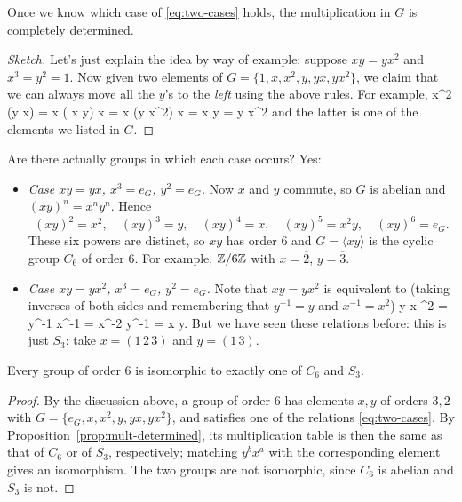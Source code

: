 \documentclass[reqno,11pt]{amsart}
\begin{document}
\begin{proposition}\label{prop:mult-determined}
Once we know which case of \eqref{eq:two-cases} holds, the multiplication
in $G$ is completely determined.
\end{proposition}
\begin{proof}[Sketch] Let's just explain the idea by way of example: suppose $xy=yx^2$ and $x^3=y^2=1$. Now given two elements of $G = \{ 1 , x , x^2, y, yx, yx^2 \}$, we claim that we can always move all the $y$'s to the \textit{left} using the above rules. For example, \be{} x^2 \cdot (y x) = x \cdot ( x \cdot y) \cdot x = x \cdot (y x^2) \cdot x = x \cdot y = y x^2 \ee and the latter is one of the elements we listed in $G$. 
%	
%	
%	
%	
\end{proof}

Are there actually groups in which each case occurs? Yes:

\begin{itemize}
  \item \emph{Case $xy=yx$, $x^3=e_G$, $y^2=e_G$.} Now $x$ and $y$
  commute, so $G$ is abelian and $(xy)^n=x^ny^n$. Hence
  \[
    (xy)^2=x^2,\quad (xy)^3=y,\quad (xy)^4=x,\quad (xy)^5=x^2y,\quad
    (xy)^6=e_G.
  \]
  These six powers are distinct, so $xy$ has order $6$ and
  $G=\langle xy\rangle$ is the cyclic group $C_6$ of order $6$.
  For example, $\mathbb{Z}/6\mathbb{Z}$ with $x=\overline2$, $y=\overline3$.
  \item \emph{Case $xy=yx^2$, $x^3=e_G$, $y^2=e_G$.}  Note that $x y = yx^2$ is equivalent to (taking inverses of both sides and remembering that $y^{-1}=y$ and $x^{-1}=x^2$) \be{}  y x ^2 = y^{-1} x^{-1} = x^{-2} y^{-1} = x y. \ee But we have seen these relations before: this is just $S_3$:
  take $x=(1\,2\,3)$ and $y=(1\,3)$.
\end{itemize}

\begin{theorem}
Every group of order $6$ is isomorphic to exactly one of $C_6$ and $S_3$.
\end{theorem}
\begin{proof}
By the discussion above, a group of order $6$ has elements $x,y$ of orders
$3,2$ with $G=\{e_G,x,x^2,y,yx,yx^2\}$, and satisfies one of the relations
\eqref{eq:two-cases}. By Proposition~\ref{prop:mult-determined}, its
multiplication table is then the same as that of $C_6$ or of $S_3$,
respectively; matching $y^bx^a$ with the corresponding element gives an
isomorphism. The two groups are not isomorphic, since $C_6$ is abelian and
$S_3$ is not.
\end{proof}
\end{document}
